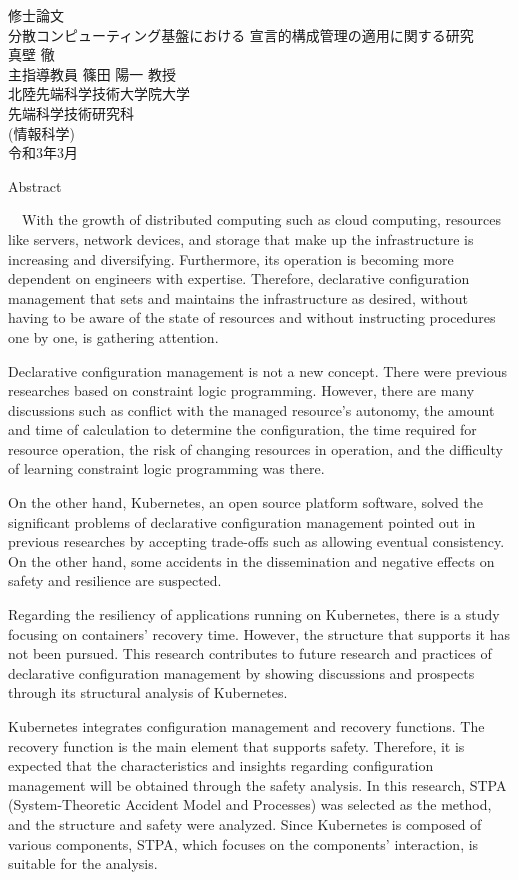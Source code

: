 \documentclass[12pt,a4j]{ujreport}
\begin{document}
\thispagestyle{empty}
\begin{center}
    修士論文\\
    \vfill
    分散コンピューティング基盤における 宣言的構成管理の適用に関する研究\\
    \vfill
    真壁 徹\\
    \vfill
    主指導教員 篠田 陽一 教授 \\
    \vfill
    北陸先端科学技術大学院大学\\
    先端科学技術研究科\\
    (情報科学)\\
    \vfill
    令和3年3月\\
    \vfill
\end{center}
\clearpage
\centerline{Abstract}
　With the growth of distributed computing such as cloud computing, resources like servers, network devices, and storage that make up the infrastructure is increasing and diversifying. Furthermore, its operation is becoming more dependent on engineers with expertise. Therefore, declarative configuration management that sets and maintains the infrastructure as desired, without having to be aware of the state of resources and without instructing procedures one by one, is gathering attention.

Declarative configuration management is not a new concept. There were previous researches based on constraint logic programming. However, there are many discussions such as conflict with the managed resource's autonomy, the amount and time of calculation to determine the configuration, the time required for resource operation, the risk of changing resources in operation, and the difficulty of learning constraint logic programming was there.

On the other hand, Kubernetes, an open source platform software, solved the significant problems of declarative configuration management pointed out in previous researches by accepting trade-offs such as allowing eventual consistency. On the other hand, some accidents in the dissemination and negative effects on safety and resilience are suspected.

Regarding the resiliency of applications running on Kubernetes, there is a study focusing on containers' recovery time. However, the structure that supports it has not been pursued. This research contributes to future research and practices of declarative configuration management by showing discussions and prospects through its structural analysis of Kubernetes.

Kubernetes integrates configuration management and recovery functions. The recovery function is the main element that supports safety. Therefore, it is expected that the characteristics and insights regarding configuration management will be obtained through the safety analysis. In this research, STPA (System-Theoretic Accident Model and Processes) was selected as the method, and the structure and safety were analyzed. Since Kubernetes is composed of various components, STPA, which focuses on the components' interaction, is suitable for the analysis.
\end{document}
